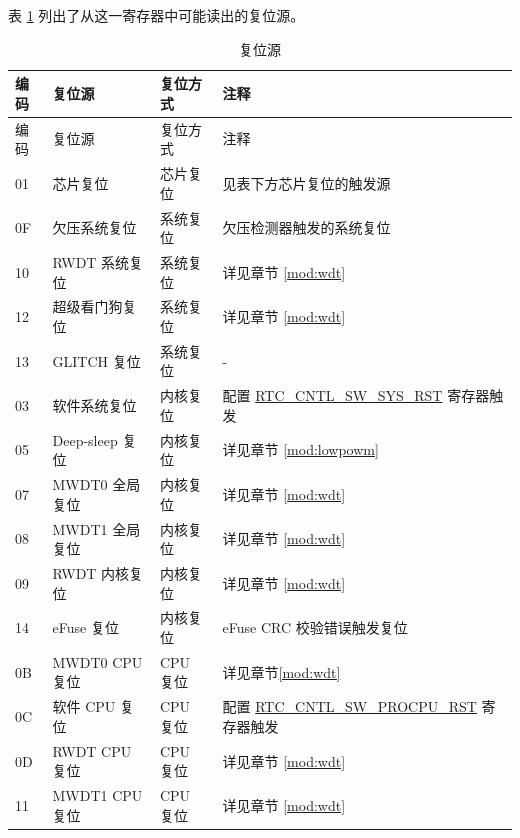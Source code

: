 \documentclass[main\_\_CN.tex]{subfiles}
\begin{document}
表 \ref{table:resetreasons} 列出了从这一寄存器中可能读出的复位源。

\begin{longtable}[c]{ |p{0.8cm}|p{3.5cm}|p{3.5cm}|p{8.2cm}| }
\caption{复位源}
    \label{table:resetreasons}  \\
        \hline
        \rowcolor{lightgray}
        编码 & 复位源 & 复位方式 & 注释\\
        \hline
        \endfirsthead
        \hline
       \rowcolor{lightgray}
        编码 & 复位源 & 复位方式 & 注释 \\
        \hline
        \endhead
        \endfoot
        \hexprefix{}01 & 芯片复位 & 芯片复位 &  见表下方芯片复位的触发源\\
        \hline
        \hexprefix{}0F & 欠压系统复位 & 系统复位 & 欠压检测器触发的系统复位\\
        \hline
        \hexprefix{}10 & RWDT 系统复位 & 系统复位 & 详见章节 \ref{mod:wdt} \textit{\nameref{mod:wdt}}\\
        \hline
        \hexprefix{}12 & 超级看门狗复位 & 系统复位 & 详见章节 \ref{mod:wdt} \textit{\nameref{mod:wdt}} \\
        \hline
        \hexprefix{}13 & GLITCH 复位 & 系统复位 & - \\
        \hline
        \hexprefix{}03 & 软件系统复位 & 内核复位 & 配置 \hyperref[fielddesc:RTCCNTLSWSYSRST]{RTC\_CNTL\_SW\_SYS\_RST} 寄存器触发\\
        \hline
        \hexprefix{}05 & Deep-sleep 复位 & 内核复位 & 详见章节 \ref{mod:lowpowm} \textit{\nameref{mod:lowpowm}} \\
        \hline
        \hexprefix{}07 & MWDT0 全局复位 & 内核复位 & 详见章节 \ref{mod:wdt} \textit{\nameref{mod:wdt}}\\
        \hline
        \hexprefix{}08 & MWDT1 全局复位 & 内核复位 & 详见章节 \ref{mod:wdt} \textit{\nameref{mod:wdt}}\\
        \hline
        \hexprefix{}09 & RWDT 内核复位 & 内核复位 & 详见章节 \ref{mod:wdt} \textit{\nameref{mod:wdt}}\\
        \hline
        \hexprefix{}14 & eFuse 复位 & 内核复位 & eFuse CRC 校验错误触发复位 \\
        \hline
        \hexprefix{}0B & MWDT0 CPU 复位 & CPU 复位 & 详见章节\ref{mod:wdt} \textit{\nameref{mod:wdt}}\\
        \hline
         \hexprefix{}0C & 软件 CPU 复位 & CPU 复位 & 配置 \hyperref[fielddesc:RTCCNTLSWPROCPURST]{RTC\_CNTL\_SW\_PROCPU\_RST} 寄存器触发\\
        \hline
        \hexprefix{}0D & RWDT CPU 复位 & CPU 复位 & 详见章节 \ref{mod:wdt} \textit{\nameref{mod:wdt}}\\
        \hline
        \hexprefix{}11 & MWDT1 CPU 复位 & CPU 复位 & 详见章节 \ref{mod:wdt} \textit{\nameref{mod:wdt}}\\
        \hline

    \end{longtable}
\end{document}
